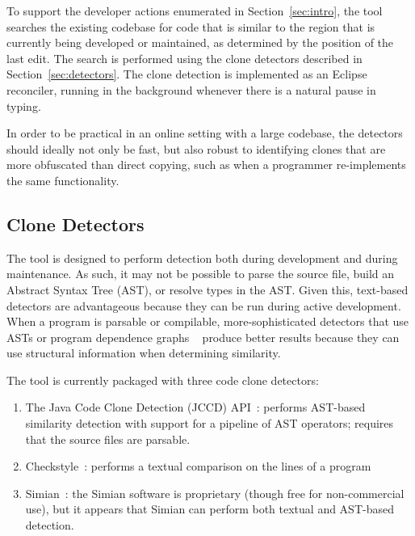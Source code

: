 \documentclass[nocopyrightspace,10pt]{sigplanconf}
\begin{document}


To support the developer actions enumerated in Section~\ref{sec:intro},
the tool searches the existing codebase for code
that is similar to the region that is currently being developed or maintained, 
as determined by the position of the last edit.
The search is performed using the clone detectors
described in Section~\ref{sec:detectors}. The clone detection is implemented as
an Eclipse reconciler, running in the background whenever there
is a natural pause in typing.

In order to be practical in an online
setting with a large codebase, the detectors should ideally 
not only be fast, but also
robust to identifying clones that are more obfuscated than direct
copying, such as when a programmer re-implements the same
functionality.

\subsection{Clone Detectors}
The tool is designed to perform detection both during development and
during maintenance.  As such, it may not be possible to parse the source
file, build an Abstract Syntax Tree (AST), or resolve types in the AST. Given this, text-based detectors
are advantageous because they can be run during active
development. When a program is parsable or compilable,
more-sophisticated detectors that use ASTs or program
dependence graphs ~\cite{LiE2011} produce better results
because they can use structural information when determining
similarity.

\label{sec:detectors}
The tool is currently packaged with three code clone detectors:

\begin{enumerate}
\item The Java Code Clone Detection (JCCD) API~\cite{JCCD}: performs
  AST-based similarity detection with support for a pipeline of AST
  operators; requires that the source files are parsable.
\item Checkstyle~\cite{CheckStyle}: performs a textual comparison on
  the lines of a program
\item Simian~\cite{Simian}: the Simian software is proprietary (though
  free for non-commercial use), but it appears that Simian can perform
  both textual and AST-based detection.
\end{enumerate}
\end{document}
